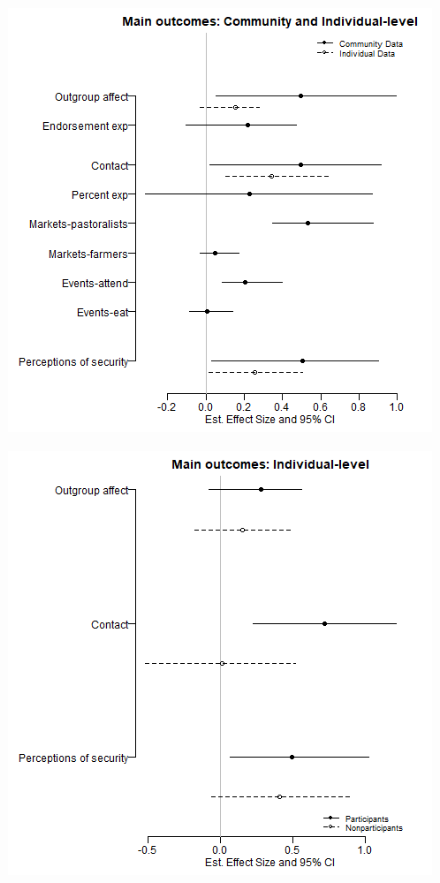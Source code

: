 \documentclass[11pt]{article}
\begin{document}
\begin{figure}[!h]
    \begin{minipage}[b]{.48\textwidth}
        \includegraphics[width=\linewidth]{../figs/ecpn_coefplots_MainOuts-cats.png}
        \label{fig:fig1}
    \end{minipage}
    \hfill
    \begin{minipage}[b]{.48\textwidth}
        \includegraphics[width=\linewidth]{../figs/ecpn_coefplots_MainOuts_panel-cats.png}
        \label{fig:fig2}
    \end{minipage}
\end{figure}
\end{document}
